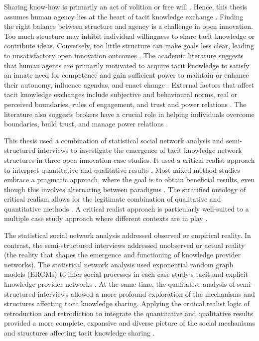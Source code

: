 Sharing know-how is primarily an act of volition or free will \citep{polanyi1966tacit,hubrich2015embodiment,zhang2016critical}. Hence, this thesis assumes human agency lies at the heart of tacit knowledge exchange \citep{phelps2012knowledge}. Finding the right balance between structure and agency is a challenge in open innovation. Too much structure may inhibit individual willingness to share tacit knowledge or contribute ideas. Conversely, too little structure can make goals less clear, leading to unsatisfactory open innovation outcomes \citep{davis2010agency}. The academic literature suggests that human agents are primarily motivated to acquire tacit knowledge to satisfy an innate need for competence and gain sufficient power to maintain or enhance their autonomy, influence agendas, and enact change \citep{white1959motivation,bandura1977self,deci1989self}. External factors that affect tacit knowledge exchanges include subjective and behavioural norms, real or perceived boundaries, rules of engagement, and trust and power relations \citep{parsons1937structure,loyal2001agency}. The literature also suggests brokers have a crucial role in helping individuals overcome boundaries, build trust, and manage power relations \citep{obstfeld2014brokerage,quintane2016brokers}. \medskip

This thesis used a combination of statistical social network analysis and semi-structured interviews to investigate the emergence of tacit knowledge network structures in three open innovation case studies. It used a critical realist approach to interpret quantitative and qualitative results \citep{bhaskar2013realist}. Most mixed-method studies embrace a pragmatic approach, where the goal is to obtain beneficial results, even though this involves alternating between paradigms \citep{creswell2011designing}. The stratified ontology of critical realism allows for the legitimate combination of qualitative and quantitative methods \citep{giddings2006mixed,mcevoy2006critical}. A critical realist approach is particularly well-suited to a multiple case study approach where different contexts are in play \citep{welch2011theorising}. \medskip

The statistical social network analysis addressed observed or empirical reality. In contrast, the semi-structured interviews addressed unobserved or actual reality (the reality that shapes the emergence and functioning of knowledge provider networks). The statistical network analysis used exponential random graph models (ERGMs) to infer social processes in each case study's tacit and explicit knowledge provider networks \citep{robins2007introduction}. At the same time, the qualitative analysis of semi-structured interviews allowed a more profound exploration of the mechanisms and structures affecting tacit knowledge sharing. Applying the critical realist logic of retroduction and retrodiction to integrate the quantitative and qualitative results provided a more complete, expansive and diverse picture of the social mechanisms and structures affecting tacit knowledge sharing \citep{zachariadis2013methodological,mcavoy2018critical}. \medskip

